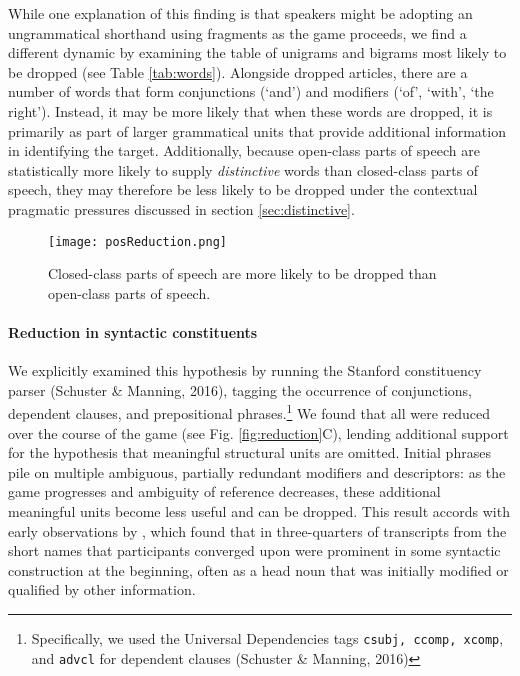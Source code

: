 While one explanation of this finding is that speakers might be adopting an ungrammatical shorthand using fragments as the game proceeds, we find a different dynamic by examining the table of unigrams and bigrams most likely to be dropped (see Table \ref{tab:words}). 
Alongside dropped articles, there are a number of words that form conjunctions (`and') and modifiers (`of', `with', `the right'). 
Instead, it may be more likely that when these words are dropped, it is primarily as part of larger grammatical units that provide additional information in identifying the target.
Additionally, because open-class parts of speech are statistically more likely to supply \emph{distinctive} words than closed-class parts of speech, they may therefore be less likely to be dropped under the contextual pragmatic pressures discussed in section \ref{sec:distinctive}.

\begin{figure}[t!]
\centering
\texttt{[image: posReduction.png]}
\caption{Closed-class parts of speech are more likely to be dropped than open-class parts of speech.} 
\label{fig:pos}
\end{figure}

\paragraph{Reduction in syntactic constituents} 
We explicitly examined this hypothesis by running the Stanford constituency parser (Schuster \& Manning, 2016), tagging the occurrence of conjunctions, dependent clauses, and
prepositional phrases.\footnote{Specifically,
  we used the Universal Dependencies tags \texttt{csubj, ccomp, xcomp},
  and \texttt{advcl} for dependent clauses (Schuster \& Manning, 2016)} 
We found that all were reduced over the course of the game (see Fig.
\ref{fig:reduction}C), lending additional support for the hypothesis
that meaningful structural units are omitted. Initial phrases pile
on multiple ambiguous, partially redundant modifiers and descriptors: as
the game progresses and ambiguity of reference decreases, these
additional meaningful units become less useful and can be dropped.
This result accords with early observations by \cite{Carroll80_NamingHedges}, which found that in three-quarters of transcripts from \cite{KraussWeinheimer64_ReferencePhrases} the short names that participants converged upon were prominent in some syntactic construction at the beginning, often as a head noun that was initially modified or qualified by other information. 

